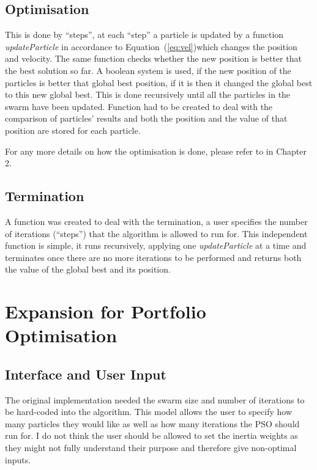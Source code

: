     \subsection{Optimisation} %
    \label{sub:optimisation}
    This is done by ``steps'', at each ``step'' a particle is updated by a function \textit{updateParticle} in accordance to Equation~(\ref{eq:vel})which changes the position and velocity. The same function checks whether the new position is better that the best solution so far. A boolean system is used, if the new position of the particles is better that global best position, if it is then it changed the global best to this new global best. This is done recursively until all the particles in the swarm have been updated. Function had to be created to deal with the comparison of particles' results and both the position and the value of that position are stored for each particle. 

    For any more details on how the optimisation is done, please refer to  in Chapter 2.
    \subsection{Termination} %
    \label{sub:termination}
    A function was created to deal with the termination, a user specifies the number of iterations (``steps'') that the algorithm is allowed to run for. This independent function is simple, it runs recursively, applying one \textit{updateParticle} at a time and terminates once there are no more iterations to be performed and returns both the value of the global best and its position. 

  \section{Expansion for Portfolio Optimisation} %
  \label{sec:expansion_for_portfolio_optimisation}

    \subsection{Interface and User Input} %
    \label{sub:interface_and_user_input}
    The original implementation needed the swarm size and number of iterations to be hard-coded into the algorithm. This model allows the user to specify how many particles they would like as well as how many iterations the PSO should run for. I do not think the user should be allowed to set the inertia weights as they might not fully understand their purpose and therefore give non-optimal inputs.
